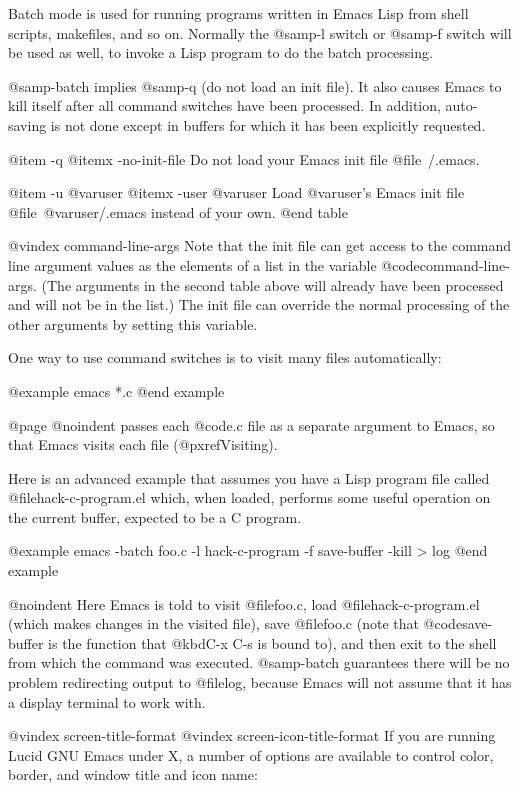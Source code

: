 {{Batch mode is used for running programs written in Emacs Lisp from shell
scripts, makefiles, and so on.  Normally the @samp{-l} switch or
@samp{-f} switch will be used as well, to invoke a Lisp program to do
the batch processing.

@samp{-batch} implies @samp{-q} (do not load an init file).  It also
causes Emacs to kill itself after all command switches have been
processed.  In addition, auto-saving is not done except in buffers for
which it has been explicitly requested.

@item -q
@itemx -no-init-file
Do not load your Emacs init file @file{~/.emacs}.

@item -u @var{user}
@itemx -user @var{user}
Load @var{user}'s Emacs init file @file{~@var{user}/.emacs} instead of
your own.
@end table

@vindex command-line-args
  Note that the init file can get access to the command line argument
values as the elements of a list in the variable
@code{command-line-args}.  (The arguments in the second table above will
already have been processed and will not be in the list.)  The init file
can override the normal processing of the other arguments by setting
this variable.

  One way to use command switches is to visit many files automatically:

@example
emacs *.c
@end example

@page
@noindent
passes each @code{.c} file as a separate argument to Emacs, so that
Emacs visits each file (@pxref{Visiting}).

  Here is an advanced example that assumes you have a Lisp program file
called @file{hack-c-program.el} which, when loaded, performs some useful
operation on the current buffer, expected to be a C program.

@example
emacs -batch foo.c -l hack-c-program -f save-buffer -kill > log
@end example

@noindent
Here Emacs is told to visit @file{foo.c}, load @file{hack-c-program.el}
(which makes changes in the visited file), save @file{foo.c} (note that
@code{save-buffer} is the function that @kbd{C-x C-s} is bound to), and
then exit to the shell from which the command was executed.  @samp{-batch}
guarantees there will be no problem redirecting output to @file{log},
because Emacs will not assume that it has a display terminal to work
with.

@vindex screen-title-format
@vindex screen-icon-title-format
If you are running Lucid GNU Emacs under X, a number of options are
available to control color, border, and window title and icon name:

}}
